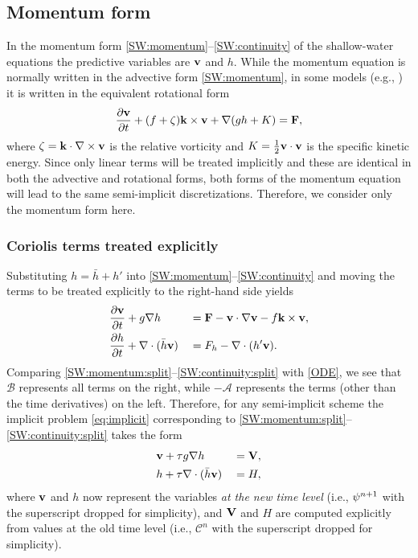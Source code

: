 \documentclass[12pt]{article}
\newcommand{\href}{\bar{h}}
\newcommand{\opA}{\mathcal{A}}
\newcommand{\opB}{\mathcal{B}}
\newcommand{\opC}{\mathcal{C}}
\newcommand{\cross}{\times}
\newcommand{\del}{\nabla}
\begin{document}
\pagebreak[3]
\subsection{Momentum form}

In the momentum form \eqref{SW:momentum}--\eqref{SW:continuity} of the
shallow-water equations the predictive variables are $\mathbf{v}$ and $h$.
While the momentum equation is normally written in the advective form
\eqref{SW:momentum}, in some models (e.g., \cite{Fulton_Schubert87b}) it 
is written in the equivalent rotational form
\begin{equation}
  \frac{\partial \vecv}{\partial t} + (f+\zeta)\veck\cross\vecv 
   + \del(gh+K) = \Fmom, 
\label{SW:rotational}
\end{equation}
where $\zeta = \veck\cdot\del\cross\vecv$ is the relative vorticity and
$K=\frac12\mathbf{v}\cdot\mathbf{v}$ is the specific kinetic energy.  Since only linear
terms will be treated implicitly and these are identical in both the advective
and rotational forms, both forms of the momentum equation will lead to the
same semi-implicit discretizations.  Therefore, we consider only the momentum
form here.

\pagebreak[2]
\subsubsection{Coriolis terms treated explicitly}

Substituting $h=\href+h'$ into \eqref{SW:momentum}--\eqref{SW:continuity} and
moving the terms to be treated explicitly to the right-hand side yields
\begin{alignat}{2}
  &\frac{\partial \vecv}{\partial t} + g\del h
    &&= \Fmom - \vecv\cdot\del\vecv - f\veck\cross\vecv ,
\label{SW:momentum:split}
\\
  &\frac{\partial h}{\partial t} + \del\cdot(\href\vecv)
    &&= \Fmass - \del\cdot(h'\vecv) .
\label{SW:continuity:split}
\end{alignat}
Comparing \eqref{SW:momentum:split}--\eqref{SW:continuity:split} with
\eqref{ODE}, we see that $\opB$ represents all terms on the right, while
$-\opA$ represents the terms (other than the time derivatives) on the left.
Therefore, for any semi-implicit scheme the implicit problem
\eqref{eq:implicit} corresponding to
\eqref{SW:momentum:split}--\eqref{SW:continuity:split} takes the form
\begin{alignat}{2}
  &\vecv + \tau g\del h &&= \vecV ,
\label{SW:momentum:imp}
\\
  &h + \tau \del\cdot(\href\vecv) &&= H ,
\label{SW:continuity:imp}
\end{alignat}
where $\mathbf{v}$ and $h$ now represent the variables \emph{at the new time level}
(i.e., $\psi^{n+1}$ with the superscript dropped for simplicity), and
$\mathbf{V}$ and $H$ are computed explicitly from values at the old time level
(i.e., $\opC^n$ with the superscript dropped for simplicity).
\end{document}
